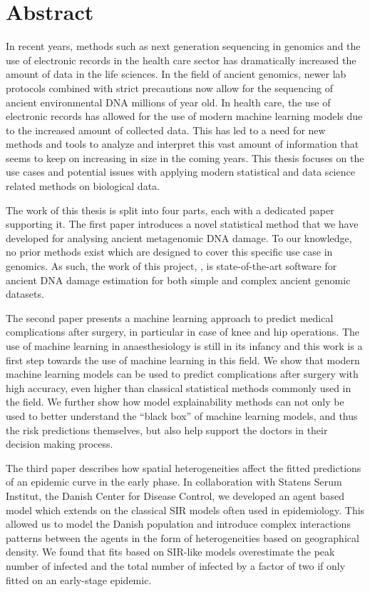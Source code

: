 \chapter{Abstract}


In recent years, methods such as next generation sequencing in genomics and the use of electronic records in the health care sector has dramatically increased the amount of data in the life sciences. In the field of ancient genomics, newer lab protocols combined with strict precautions now allow for the sequencing of ancient environmental DNA millions of year old. In health care, the use of electronic records has allowed for the use of modern machine learning models due to the increased amount of collected data.
This has led to a need for new methods and tools to analyze and interpret this vast amount of information that seems to keep on increasing in size in the coming years. This thesis focuses on the use cases and potential issues with applying modern statistical and data science related methods on biological data.

The work of this thesis is split into four parts, each with a dedicated paper supporting it. The first paper introduces a novel statistical method that we have developed for analysing ancient metagenomic DNA damage. To our knowledge, no prior methods exist which are designed to cover this specific use case in genomics. As such, the work of this project, \metaDMG, is state-of-the-art software for ancient DNA damage estimation for both simple and complex ancient genomic datasets.

The second paper presents a machine learning approach to predict medical complications after surgery, in particular in case of knee and hip operations. The use of machine learning in anaesthesiology is still in its infancy and this work is a first step towards the use of machine learning in this field. We show that modern machine learning models can be used to predict complications after surgery with high accuracy, even higher than classical statistical methods commonly used in the field.  We further show how model explainability methods can not only be used to better understand the ``black box'' of machine learning models, and thus the risk predictions themselves, but also help support the doctors in their decision making process.

The third paper describes how spatial heterogeneities affect the fitted predictions of an epidemic curve in the early phase. In collaboration with Statens Serum Institut, the Danish Center for Disease Control, we developed an agent based model which extends on the classical SIR models often used in epidemiology. This allowed us to model the Danish population and introduce complex interactions patterns between the agents in the form of heterogeneities based on geographical density. We found that fits based on SIR-like models overestimate the peak number of infected and the total number of infected by a factor of two if only fitted on an early-stage epidemic.

